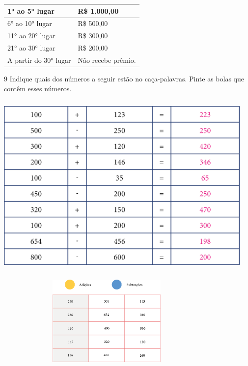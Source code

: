 \begin{longtable}[]{@{}ll@{}}
\toprule
1° ao 5° lugar & R\$ 1.000,00\tabularnewline
\midrule
\endhead
6° ao 10° lugar & R\$ 500,00\tabularnewline
11° ao 20° lugar & R\$ 300,00\tabularnewline
21° ao 30° lugar & R\$ 200,00\tabularnewline
A partir do 30° lugar & Não recebe prêmio.\tabularnewline
\bottomrule
\end{longtable}


\num{9} Indique quais dos números a seguir estão no caça-palavras. Pinte
as bolas que contêm esses números.


\includegraphics[width=5.00000in,height=3.61458in]{media/image19.png}

\includegraphics[width=4.35417in,height=1.75000in]{media/image20.png}


